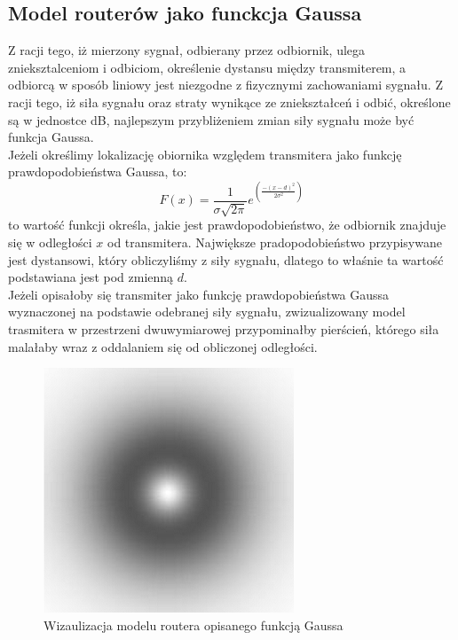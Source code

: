 \subsection{Model routerów jako funckcja Gaussa}
Z racji tego, iż mierzony sygnał, odbierany przez odbiornik, ulega znieksztalceniom i odbiciom, określenie dystansu między transmiterem, a odbiorcą w sposób liniowy jest niezgodne z fizycznymi zachowaniami sygnału. Z racji tego, iż siła sygnału oraz straty wynikące ze zniekształceń i odbić, określone są w jednostce dB, najlepszym przybliżeniem zmian siły sygnału może być funkcja Gaussa.\\
Jeżeli określimy lokalizację obiornika względem transmitera jako funkcję prawdopodobieństwa Gaussa, to:
\begin{equation}
F(x) = \frac{1}{\sigma\sqrt{2\pi}}e^{\left(\frac{-(x-d)^2}{2\sigma^2}\right)}
\end{equation}
to wartość funkcji określa, jakie jest prawdopodobieństwo, że odbiornik znajduje się w odległości $x$ od transmitera. Największe pradopodobieństwo przypisywane jest dystansowi, który obliczyliśmy z siły sygnału, dlatego to właśnie ta wartość podstawiana jest pod zmienną $d$.\\
Jeżeli opisałoby się transmiter jako funkcję prawdopobieństwa Gaussa wyznaczonej na podstawie odebranej siły sygnału, zwizualizowany model trasmitera w przestrzeni dwuwymiarowej przypominałby pierścień, którego siła malałaby wraz z oddalaniem się od obliczonej odległości.
\begin{figure}[H]			
	\centering
	\caption{Wizaulizacja modelu routera opisanego funkcją Gaussa}
	\includegraphics{router_Gaussa_wizualizacja}
\end{figure}
